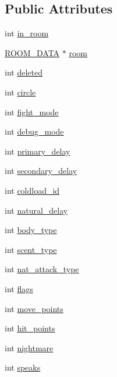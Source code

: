 \subsection*{Public Attributes}
\begin{DoxyCompactItemize}
\item 
int \hyperlink{structchar__data_a74b1fc0e8efe1080d0d2d9a4c8865143}{in\-\_\-room}
\item 
\hyperlink{room_8h_aede519ef65d80b5242a4a28b69d5e097}{R\-O\-O\-M\-\_\-\-D\-A\-T\-A} $\ast$ \hyperlink{structchar__data_a139f4e4fdd0c5c7e06cc012513089cf9}{room}
\item 
int \hyperlink{structchar__data_a6687df1032465427466cf99cb619dc56}{deleted}
\item 
int \hyperlink{structchar__data_a9d740447f88c3dd102e1437f7f18d0dc}{circle}
\item 
int \hyperlink{structchar__data_a4ed26a1ab30594d267350519df37e01a}{fight\-\_\-mode}
\item 
int \hyperlink{structchar__data_a5fab2b225ef502d1adffa47c28c85a8e}{debug\-\_\-mode}
\item 
int \hyperlink{structchar__data_ac68957b095c8a7b2c9276c389ac808f4}{primary\-\_\-delay}
\item 
int \hyperlink{structchar__data_a5a51fbe07402fcc858396273dcd53d5b}{secondary\-\_\-delay}
\item 
int \hyperlink{structchar__data_ad73f9d5243d965b2de3e1a70c5966e7a}{coldload\-\_\-id}
\item 
int \hyperlink{structchar__data_a02326e2a714aa8c6500289ceda8a3ec0}{natural\-\_\-delay}
\item 
int \hyperlink{structchar__data_ab52e7dd5e4a6644dd9782662ea65c548}{body\-\_\-type}
\item 
int \hyperlink{structchar__data_abb45b44ae74ce9ec791ec86be8ef23e2}{scent\-\_\-type}
\item 
int \hyperlink{structchar__data_add43c159ec94b3997dd4a0aa0f7ae4bb}{nat\-\_\-attack\-\_\-type}
\item 
int \hyperlink{structchar__data_aac0bf5fd18d11679fe8515208a4cc49a}{flags}
\item 
int \hyperlink{structchar__data_a2aee90d76dee12d6a6bcb1a04b48888d}{move\-\_\-points}
\item 
int \hyperlink{structchar__data_ab19664afdb3e0f93f7820e9ba19522ed}{hit\-\_\-points}
\item 
int \hyperlink{structchar__data_ab6702802ad01f66f5988e81281e6e793}{nightmare}
\item 
int \hyperlink{structchar__data_af1c2d26314e124d4120cc0cfa43e6ace}{speaks}

\end{DoxyCompactItemize}
